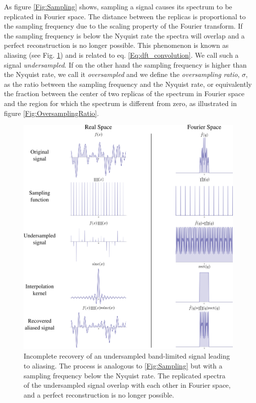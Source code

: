 As figure \ref{Fig:Sampling} shows, sampling a signal causes its spectrum to be
replicated in Fourier space. The distance between the replicas is proportional
to the sampling frequency due to the scaling property of the Fourier
transform. If the sampling frequency is below the Nyquist rate the spectra will
overlap and a perfect reconstruction is no longer possible. This phenomenon is known as
aliasing (see Fig. \ref{Fig:Undersampling}) and is related to eq. \ref{Eq:dft_convolution}. We call such a signal {\em undersampled}. If on the other hand
the sampling frequency is higher than the Nyquist rate, we call it {\em
  oversampled} and we define the {\em oversampling ratio}, $\sigma$, as the ratio between the
sampling frequency and the Nyquist rate, or equivalently the fraction between
the center of two replicas of the spectrum in Fourier space and the region for
which the spectrum is different from zero, as illustrated in figure \ref{Fig:OversamplingRatio}.

\begin{figure}[h!]
  \centering
  \includegraphics[width=0.9 \columnwidth]{Fourier_Theory/Sampling3.png}
  \caption{Incomplete recovery of an undersampled band-limited signal leading to
    aliasing. The process is analogous to \ref{Fig:Sampling} but with a sampling
    frequency below the Nyquist rate. 
    The replicated spectra of the undersampled signal overlap with each other in
    Fourier space,
    and a perfect reconstruction is no longer possible.}
  \label{Fig:Undersampling}
\end{figure}

